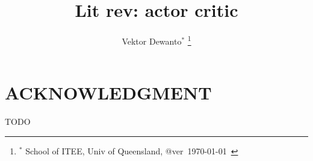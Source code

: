 \documentclass[letterpaper, 10 pt, conference]{ieeeconf}  %
\title{\LARGE \bf
Lit rev: actor critic
}
\author{Vektor Dewanto$^{*}$
\thanks{$^{*}$ School of ITEE, Univ of Queensland, @ver~\today~\currenttime}%
}
\begin{document}
\maketitle
\thispagestyle{empty}
\pagestyle{plain}



% 




\addtolength{\textheight}{-12cm}   %


\section*{ACKNOWLEDGMENT}
TODO



\end{document}
